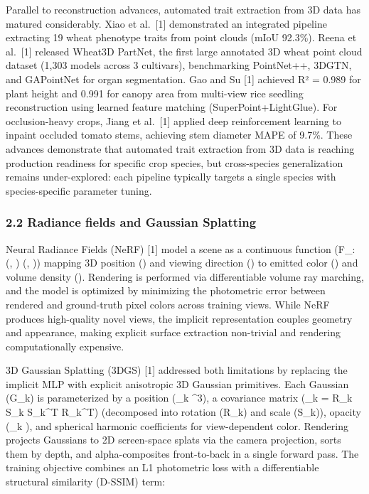 \documentclass[11pt,a4paper]{article}
\begin{document}
Parallel to reconstruction advances, automated trait extraction from 3D
data has matured considerably. Xiao et al.~{[}1{]} demonstrated an
integrated pipeline extracting 19 wheat phenotype traits from point
clouds (mIoU 92.3\%). Reena et al.~{[}1{]} released Wheat3D PartNet, the
first large annotated 3D wheat point cloud dataset (1,303 models across
3 cultivars), benchmarking PointNet++, 3DGTN, and GAPointNet for organ
segmentation. Gao and Su {[}1{]} achieved R² = 0.989 for plant height
and 0.991 for canopy area from multi-view rice seedling reconstruction
using learned feature matching (SuperPoint+LightGlue). For
occlusion-heavy crops, Jiang et al.~{[}1{]} applied deep reinforcement
learning to inpaint occluded tomato stems, achieving stem diameter MAPE
of 9.7\%. These advances demonstrate that automated trait extraction
from 3D data is reaching production readiness for specific crop species,
but cross-species generalization remains under-explored: each pipeline
typically targets a single species with species-specific parameter
tuning.

\subsubsection{2.2 Radiance fields and Gaussian
Splatting}\label{radiance-fields-and-gaussian-splatting}

Neural Radiance Fields (NeRF) {[}1{]} model a scene as a continuous
function (F\_\theta: (, ) \rightarrow (,
\sigma)) mapping 3D position () and viewing direction
() to emitted color () and volume density (\sigma).
Rendering is performed via differentiable volume ray marching, and the
model is optimized by minimizing the photometric error between rendered
and ground-truth pixel colors across training views. While NeRF produces
high-quality novel views, the implicit representation couples geometry
and appearance, making explicit surface extraction non-trivial and
rendering computationally expensive.

3D Gaussian Splatting (3DGS) {[}1{]} addressed both limitations by
replacing the implicit MLP with explicit anisotropic 3D Gaussian
primitives. Each Gaussian (G\_k) is parameterized by a position
(\boldsymbol{\mu}\_k \in {}\^{}3), a covariance matrix
(\Sigma\_k = R\_k S\_k S\_k\^{}T R\_k\^{}T) (decomposed into rotation
(R\_k) and scale (S\_k)), opacity (\alpha\_k \in [0,1]), and spherical
harmonic coefficients for view-dependent color. Rendering projects
Gaussians to 2D screen-space splats via the camera projection, sorts
them by depth, and alpha-composites front-to-back in a single forward
pass. The training objective combines an L1 photometric loss with a
differentiable structural similarity (D-SSIM) term:
\end{document}
